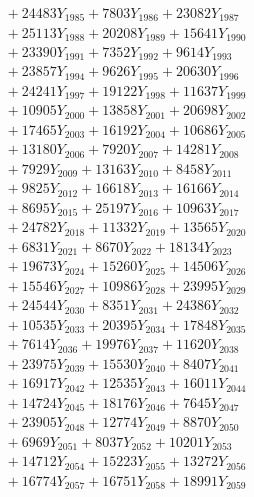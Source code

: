 \documentclass[a4paper,10pt]{article}
\begin{document}
{\begin{align}
&\;  + 24483 Y_{1985} + 7803 Y_{1986} + 23082 Y_{1987} \\[0.3ex]
&\;  + 25113 Y_{1988} + 20208 Y_{1989} + 15641 Y_{1990} \\[0.3ex]
&\;  + 23390 Y_{1991} + 7352 Y_{1992} + 9614 Y_{1993} \\[0.3ex]
&\;  + 23857 Y_{1994} + 9626 Y_{1995} + 20630 Y_{1996} \\[0.3ex]
&\;  + 24241 Y_{1997} + 19122 Y_{1998} + 11637 Y_{1999} \\[0.3ex]
&\;  + 10905 Y_{2000} + 13858 Y_{2001} + 20698 Y_{2002} \\[0.3ex]
&\;  + 17465 Y_{2003} + 16192 Y_{2004} + 10686 Y_{2005} \\[0.3ex]
&\;  + 13180 Y_{2006} + 7920 Y_{2007} + 14281 Y_{2008} \\[0.5ex]\allowbreak
&\;  + 7929 Y_{2009} + 13163 Y_{2010} + 8458 Y_{2011} \\[0.3ex]
&\;  + 9825 Y_{2012} + 16618 Y_{2013} + 16166 Y_{2014} \\[0.3ex]
&\;  + 8695 Y_{2015} + 25197 Y_{2016} + 10963 Y_{2017} \\[0.3ex]
&\;  + 24782 Y_{2018} + 11332 Y_{2019} + 13565 Y_{2020} \\[0.3ex]
&\;  + 6831 Y_{2021} + 8670 Y_{2022} + 18134 Y_{2023} \\[0.3ex]
&\;  + 19673 Y_{2024} + 15260 Y_{2025} + 14506 Y_{2026} \\[0.3ex]
&\;  + 15546 Y_{2027} + 10986 Y_{2028} + 23995 Y_{2029} \\[0.3ex]
&\;  + 24544 Y_{2030} + 8351 Y_{2031} + 24386 Y_{2032} \\[0.3ex]
&\;  + 10535 Y_{2033} + 20395 Y_{2034} + 17848 Y_{2035} \\[0.3ex]
&\;  + 7614 Y_{2036} + 19976 Y_{2037} + 11620 Y_{2038} \\[0.5ex]\allowbreak
&\;  + 23975 Y_{2039} + 15530 Y_{2040} + 8407 Y_{2041} \\[0.3ex]
&\;  + 16917 Y_{2042} + 12535 Y_{2043} + 16011 Y_{2044} \\[0.3ex]
&\;  + 14724 Y_{2045} + 18176 Y_{2046} + 7645 Y_{2047} \\[0.3ex]
&\;  + 23905 Y_{2048} + 12774 Y_{2049} + 8870 Y_{2050} \\[0.3ex]
&\;  + 6969 Y_{2051} + 8037 Y_{2052} + 10201 Y_{2053} \\[0.3ex]
&\;  + 14712 Y_{2054} + 15223 Y_{2055} + 13272 Y_{2056} \\[0.3ex]
&\;  + 16774 Y_{2057} + 16751 Y_{2058} + 18991 Y_{2059} \\[0.3ex]

\end{align}}
\end{document}

